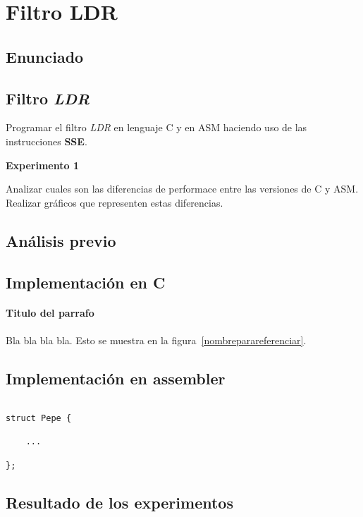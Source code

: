 \section{Filtro LDR}
\subsection{Enunciado}

\subsection*{Filtro \textit{LDR}}
  Programar el filtro \textit{LDR} en lenguaje C y en
  ASM haciendo uso de las instrucciones \textbf{SSE}.

\vspace*{0.3cm} \noindent
\textbf{Experimento 1}

  Analizar cuales son las diferencias de performace entre las versiones de C y ASM. 
  Realizar gráficos que representen estas diferencias.
  
\subsection{An\'alisis previo}

\subsection{Implementaci\'on en C}
\paragraph{\textbf{Titulo del parrafo} } Bla bla bla bla.
Esto se muestra en la figura~\ref{nombreparareferenciar}.
\subsection{Implementaci\'on en assembler}
\begin{codesnippet}
\begin{verbatim}

struct Pepe {

    ...

};
\end{verbatim}
\end{codesnippet}
\subsection{Resultado de los experimentos}


